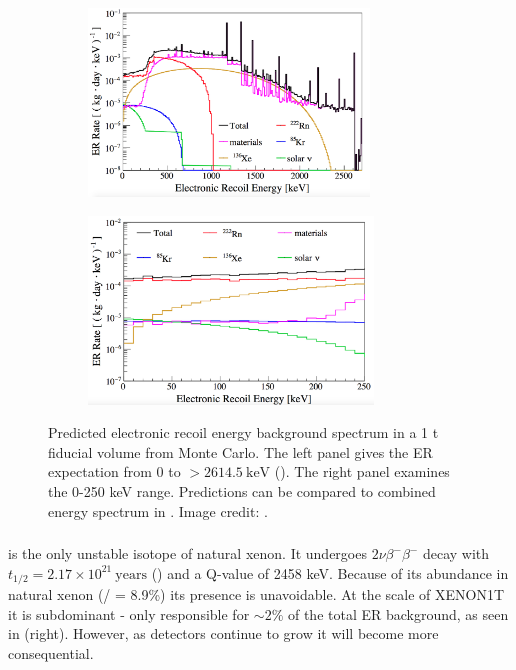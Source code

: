 \begin{figure}
    \centering
    \begin{subfigure}[t]{0.5\textwidth}
        \centering
        \includegraphics[height=5cm]{ERRateMCFull}
    \end{subfigure}%
    \begin{subfigure}[t]{0.5\textwidth}
        \centering
        \includegraphics[height=5cm]{ERRateMCZoomed}
    \end{subfigure}
    \caption{Predicted electronic recoil energy background spectrum in a 1 t fiducial volume from Monte Carlo.  The left panel gives the
    ER expectation from 0 to $> 2614.5\ \mathrm{keV}$ ().  The right panel examines the 0-250 keV range.  Predictions can
    be compared to combined energy spectrum in .  Image credit:
    .}
	\label{fig:backgrounds_er_spectrum}
\end{figure}



\subsubsection{}
\label{subsubsec:backgrounds_electronic_xe}
 is the only unstable isotope of natural xenon.  It undergoes $2 \nu \beta^- \beta^-$ decay with
$t_{1/2} = 2.17 \times 10^{21}\ \mathrm{years}$ () and a Q-value of 2458 keV.  Because of its abundance in natural
xenon (/ = 8.9\%) its presence is unavoidable.  At the scale of XENON1T it is subdominant - only responsible for
${\sim}2 \%$ of the total ER background, as seen in  (right).  However, as detectors continue to grow
it will become more consequential.



